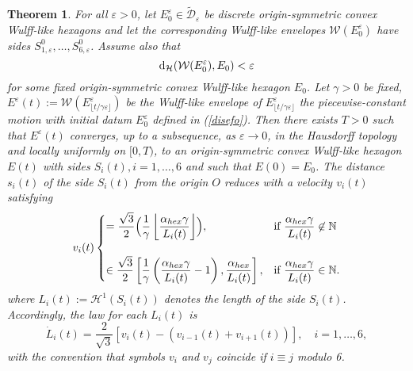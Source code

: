\documentclass{interact}
\numberwithin{equation}{section}
\newtheorem{thm}{Theorem}[section]
\theoremstyle{definition}
\renewcommand{\H}{\mathcal{H}}
\newcommand{\D}{\mathcal{D}}
\renewcommand{\epsilon}{\varepsilon}
\def\e{\epsilon}
\begin{document}
\begin{thm}\label{limitmotion1}For all $\epsilon>0$, let $E_0^\epsilon\in\widetilde{\D}_\epsilon$ be  discrete origin-symmetric convex Wulff-like hexagons and let the corresponding Wulff-like envelopes $\mathcal{W}(E_0^\epsilon)$ have sides $S^0_{1,\epsilon},\dots,S^0_{6,\epsilon}$. Assume also that
\begin{equation}
{\rm{d}}_\H(\mathcal{W}(E_0^\epsilon),E_0)<\epsilon
\label{approxinitial}
\end{equation}
for some fixed origin-symmetric convex Wulff-like hexagon $E_0$. Let $\gamma>0$ be fixed, %
$E^\e(t):=\mathcal{W}(E^\epsilon_{\lfloor t/\gamma\epsilon\rfloor})$ be the Wulff-like envelope of $E^\epsilon_{\lfloor t/\gamma\epsilon\rfloor}$ the piecewise-constant motion with initial datum $E_0^\e$ defined in {\rm(\ref{disefo})}. Then there exists $T>0$ such that $E^\epsilon(t)$ converges, up to a subsequence, as $\epsilon\to0$, in the Hausdorff topology and locally uniformly on $[0,T)$, to an origin-symmetric convex Wulff-like hexagon $E(t)$ with sides $S_i(t), i=1,\dots,6$ and such that $E(0)=E_0$. The distance $s_i(t)$ of the side $S_i(t)$ from the origin $O$ reduces with a velocity $v_i(t)$ satisfying
\begin{equation}
v_{i}(t)
\begin{cases}
=\displaystyle\frac{\sqrt3}{2}\Bigl(\frac{1}{\gamma}\left\lfloor\frac{\alpha_{hex}\gamma}{L_i(t)}\right\rfloor\Bigr), & \mbox{if $\displaystyle\frac{\alpha_{hex}\gamma}{L_i(t)}\not\in\mathbb{N}$}\\
\\
\in\displaystyle\frac{\sqrt{3}}{2}\left[\displaystyle\frac{1}{\gamma}\left(\frac{\alpha_{hex}\gamma}{L_i(t)}-1\right),\displaystyle\frac{\alpha_{hex}}{L_i(t)}\right], & \mbox{if $\displaystyle\frac{\alpha_{hex}\gamma}{L_i(t)}\in\mathbb{N}$}.
\end{cases}
\label{vl}
\end{equation}
where $L_i(t):=\H^1(S_i(t))$ denotes the length of the side $S_i(t)$. %
Accordingly, the law for each $L_i(t)$ is
\begin{equation}\label{system3biss}
\dot{L}_i(t)=\frac{2}{\sqrt{3}}\left[v_i(t)-\left(v_{i-1}(t)+v_{i+1}(t)\right)\right],\quad i=1,\dots,6,
\end{equation}
with the convention that symbols $v_i$ and $v_j$ coincide if $i\equiv j$ modulo 6.
\end{thm}
\end{document}
